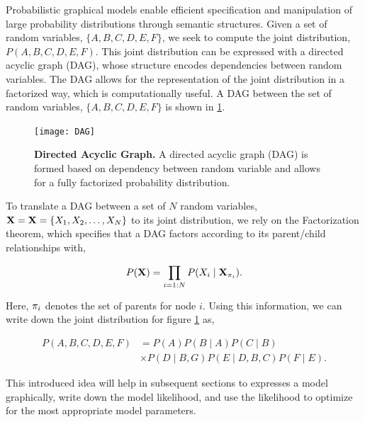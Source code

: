 Probabilistic graphical models enable efficient specification and manipulation of large probability distributions through semantic structures. Given a set of random variables, $\{A,B,C,D,E,F\}$, we seek to compute the joint distribution, $P(A,B,C,D,E,F)$. This joint distribution can be expressed with a directed acyclic graph (DAG), whose structure encodes dependencies between random variables. The DAG allows for the representation of the joint distribution in a factorized way, which is computationally useful. A DAG between the set of random variables, $\{A,B,C,D,E,F\}$ is shown in \ref{fig:DAG}. 

\begin{figure}
\begin{center}
\texttt{[image: DAG]}
\caption{{\bf Directed Acyclic Graph.} A directed acyclic graph (DAG) is formed based on dependency between random variable and allows for a fully factorized probability distribution.}
\label{fig:DAG}
\end{center}
\end{figure}

To translate a DAG between a set of $N$ random variables, ${\bf X}={\bf X}=\{X_{1},X_{2},\dots,X_{N}\}$ to its joint distribution, we rely on the Factorization theorem, which specifies that a DAG factors according to its parent/child relationships with,

\begin{equation}
P({\bf X})=\prod_{i=1:N}P(X_{i} \mid {\bf X}_{\pi_{i}}).
\end{equation}

Here, ${\bf \pi}_{i}$ denotes the set of parents for node $i$. Using this information, we can write down the joint distribution for figure \ref{fig:DAG} as,

\begin{equation}
\begin{split}
P(A,B,C,D,E,F)&=P(A)P(B\mid A)P(C\mid B)\\
&\times P(D \mid B,G)P(E \mid D,B,C)P(F\mid E).
\end{split}
\end{equation}

This introduced idea will help in subsequent sections to expresses a model graphically, write down the model likelihood, and use the likelihood to optimize for the most appropriate model parameters. 

